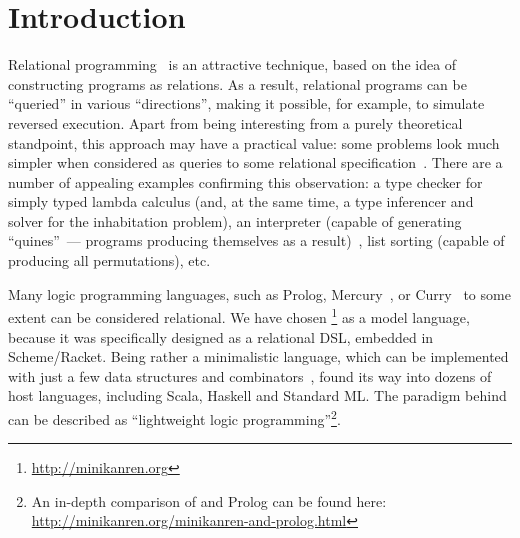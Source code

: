 
\section{Introduction}
\label{intro}

Relational programming~\cite{TRS} is an attractive technique, based on the idea
of constructing programs as relations.  As a result, relational programs can be
``queried'' in various ``directions'', making it possible, for example, to simulate
reversed execution. Apart from being interesting from a purely theoretical standpoint,
this approach may have a practical value: some problems look much simpler
when considered as queries to some relational specification~\cite{WillThesis}. There are a
number of appealing examples confirming this observation: a type checker
for simply typed lambda calculus (and, at the same time, a type inferencer and solver
for the inhabitation problem), an interpreter (capable of generating ``quines''~---
programs producing themselves as a result)~\cite{Untagged}, list sorting (capable of
producing all permutations), etc.

Many logic programming languages, such as Prolog, Mercury~\cite{MercuryFirstPaper},
or Curry~\cite{CurryFirstPaper} to some extent
can be considered relational. We have chosen \miniKanren\footnote{\url{http://minikanren.org}}
as a model language, because it was specifically designed as a relational DSL, embedded in Scheme/Racket.
Being rather a minimalistic language, which can be implemented with just a few data structures and
combinators~\cite{MicroKanren, MuKanrenNew}, \miniKanren{} found its way into dozens of host languages, including Scala, Haskell and Standard ML.
The paradigm behind \miniKanren can be described as ``lightweight logic programming''\footnote{An in-depth comparison of \miniKanren
and Prolog can be found here: \url{http://minikanren.org/minikanren-and-prolog.html}}.

